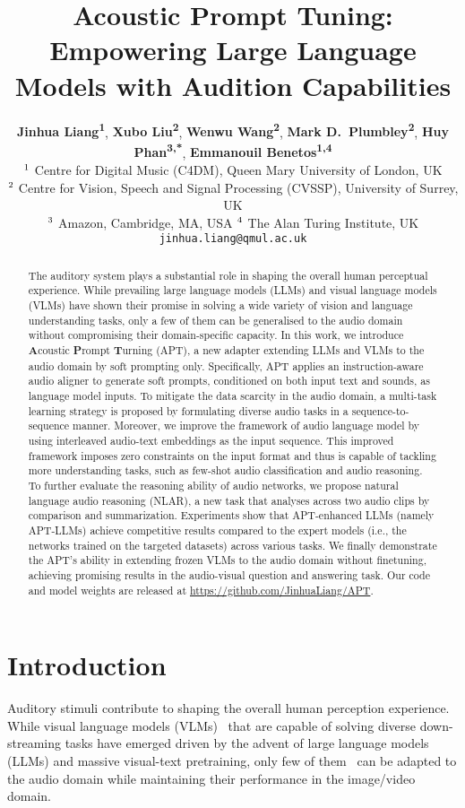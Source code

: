 \documentclass{article} %
\title{Acoustic Prompt Tuning: Empowering Large Language Models with Audition Capabilities}
\author{
    \textbf{Jinhua Liang\textsuperscript{1}}, 
    \textbf{Xubo Liu\textsuperscript{2}}, 
    \textbf{Wenwu Wang\textsuperscript{2}}, 
    \textbf{Mark D.~Plumbley\textsuperscript{2}},
    \textbf{Huy Phan\textsuperscript{3,*}}, 
    \textbf{Emmanouil Benetos\textsuperscript{1,4}} \\
    $\textsuperscript{1}$ Centre for Digital Music (C4DM), Queen Mary University of London, UK \\ 
    $\textsuperscript{2}$ Centre for Vision, Speech and Signal Processing (CVSSP), University of Surrey, UK \\
    $\textsuperscript{3}$ Amazon, Cambridge, MA, USA \hspace{0.2cm} 
    $\textsuperscript{4}$ The Alan Turing Institute, UK \\
    \texttt{jinhua.liang@qmul.ac.uk}
}
\begin{document}
\maketitle

\begin{abstract}
The auditory system plays a substantial role in shaping the overall human perceptual experience. While prevailing large language models (LLMs) and visual language models (VLMs) have shown their promise in solving a wide variety of vision and language understanding tasks, only a few of them can be generalised to the audio domain without compromising their domain-specific capacity. In this work, we introduce \textbf{A}coustic \textbf{P}rompt \textbf{T}urning (APT), a new adapter extending LLMs and VLMs to the audio domain by soft prompting only. Specifically, APT applies an instruction-aware audio aligner to generate soft prompts, conditioned on both input text and sounds, as language model inputs. To mitigate the data scarcity in the audio domain, a multi-task learning strategy is proposed by formulating diverse audio tasks in a sequence-to-sequence manner. Moreover, we improve the framework of audio language model by using interleaved audio-text embeddings as the input sequence. This improved framework imposes zero constraints on the input format and thus is capable of tackling more understanding tasks, such as few-shot audio classification and audio reasoning. To further evaluate the reasoning ability of audio networks, we propose natural language audio reasoning (NLAR), a new task that analyses across two audio clips by comparison and summarization. Experiments show that APT-enhanced LLMs (namely APT-LLMs) achieve competitive results compared to the expert models (i.e., the networks trained on the targeted datasets) across various tasks. We finally demonstrate the APT's ability in extending frozen VLMs to the audio domain without finetuning, achieving promising results in the audio-visual question and answering task. Our code and model weights are released at \url{https://github.com/JinhuaLiang/APT}.\let\thefootnote\relax{}
\end{abstract}

\section{Introduction} \label{sec:introduction}
Auditory stimuli contribute to shaping the overall human perception experience. While visual language models (VLMs)~\citep{li_blip-2_2023,liu_visual_2023,dai_instructblip_2023,shukor_unified_2023,han_imagebind-llm_2023} that are capable of solving diverse down-streaming tasks have emerged driven by the advent of large language models (LLMs) and massive visual-text pretraining, only few of them~\citep{shukor_unified_2023,han_imagebind-llm_2023} can be adapted to the audio domain while maintaining their performance in the image/video domain.
\end{document}
